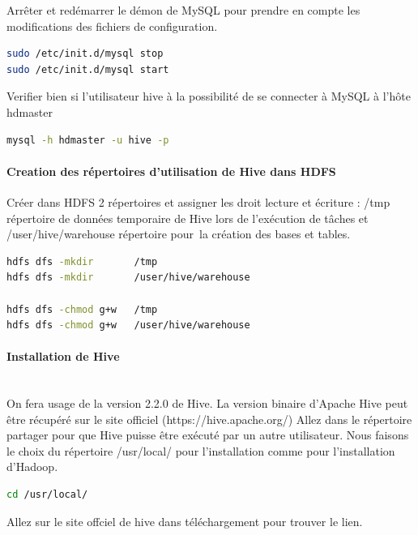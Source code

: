 \documentclass[12pt,english]{book}
\begin{document}
Arrêter et redémarrer le démon de MySQL pour prendre en compte les modifications des fichiers de configuration.

\begin{lstlisting}[language=bash, frame=single]
sudo /etc/init.d/mysql stop
sudo /etc/init.d/mysql start
\end{lstlisting}

Verifier bien si l’utilisateur hive à la possibilité de se connecter à MySQL à l’hôte hdmaster 

\begin{lstlisting}[language=bash, frame=single]
mysql -h hdmaster -u hive -p
\end{lstlisting}

\paragraph{Creation des répertoires d’utilisation de Hive dans HDFS}

Créer dans HDFS  2 répertoires et assigner les droit lecture et écriture :  /tmp répertoire de données temporaire de Hive lors de l’exécution de tâches et /user/hive/warehouse répertoire pour la création des bases et tables. 

\begin{lstlisting}[language=bash, frame=single]
hdfs dfs -mkdir       /tmp
hdfs dfs -mkdir       /user/hive/warehouse

hdfs dfs -chmod g+w   /tmp
hdfs dfs -chmod g+w   /user/hive/warehouse
\end{lstlisting}

\paragraph{Installation de Hive}\mbox{}\\

On fera usage de la version 2.2.0 de Hive.
La version binaire d’Apache Hive peut être récupéré sur le site officiel (https://hive.apache.org/)
Allez dans le répertoire partager pour que Hive puisse être exécuté par un autre utilisateur.
Nous faisons le choix du répertoire /usr/local/ pour l’installation comme pour l’installation d’Hadoop.

\begin{lstlisting}[language=bash, frame=single]
cd /usr/local/ 
\end{lstlisting}

Allez sur le site offciel de hive dans téléchargement pour trouver le lien.
\end{document}
